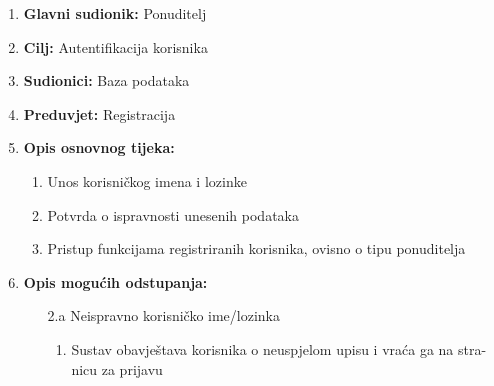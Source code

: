 \documentclass[12pt]{report}
\begin{document}
\noindent {}
\begin{enumerate}
	
	\item \textbf{Glavni sudionik: } Ponuditelj
	\item  \textbf{Cilj:} Autentifikacija korisnika
	\item  \textbf{Sudionici:} Baza podataka
	\item  \textbf{Preduvjet:} Registracija
	\item  \textbf{Opis osnovnog tijeka:}
	
	\begin{enumerate}
		
		\item Unos korisničkog imena i lozinke
		\item Potvrda o ispravnosti unesenih podataka
		\item Pristup funkcijama registriranih korisnika, ovisno o tipu ponuditelja
		
	\end{enumerate}
	
	\item  \textbf{Opis mogućih odstupanja:}
	
	\item[] \begin{enumerate}
		
		\item[2.a] Neispravno korisničko ime/lozinka
		\item[] \begin{enumerate}
			
			\item Sustav obavještava korisnika o neuspjelom upisu i vraća ga na stra-
			nicu za prijavu
			
		\end{enumerate}
		
	\end{enumerate}
	
\end{enumerate}
\end{document}
